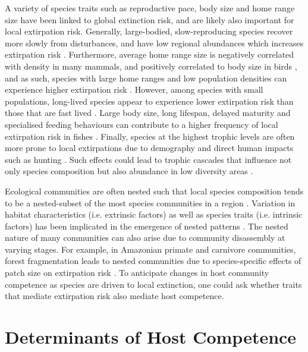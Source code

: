 A variety of species traits such as reproductive pace, body size and home range size have been linked to global extinction risk, and are likely also important for local extirpation risk.
Generally, large-bodied, slow-reproducing species recover more slowly from disturbances, and have low regional abundances which increases extirpation risk \citep{Damuth1981, Hanski1991, Nee1991, Cardillo2001, Meehan2004, Buckley2007, Davidson2009}.
Furthermore, average home range size is negatively correlated with density in many mammals, and positively correlated to body size in birds \citep{Bordes2009a, lee2011}, and as such, species with large home ranges and low population densities can experience higher extirpation risk \citep{Boyle2010}.
However, among species with small populations, long-lived species appear to experience lower extirpation risk than those that are fast lived \citep{Saether2011}.
Large body size, long lifespan, delayed maturity and specialised feeding behaviours can contribute to a higher frequency of local extirpation risk in fishes \citep{Olden2007}.
Finally, species at the highest trophic levels are often more prone to local extirpations due to demography and direct human impacts such as hunting \citep{Duffy2003}.
Such effects could lead to trophic cascades that influence not only species composition but also abundance in low diversity areas \citep{Hebblewhite2005}.

Ecological communities are often nested such that local species composition tends to be a nested-subset of the most species communities in a region \citep{Wright1998}.
Variation in habitat characteristics (i.e. extrinsic factors) as well as species traits (i.e. intrinsic factors) has been implicated in the emergence of nested patterns \citep{Almeida2007}.
The nested nature of many communities can also arise due to community disassembly at varying stages.
For example, in Amazonian primate and carnivore communities, forest fragmentation leads to nested communities due to species-specific effects of patch size on extirpation risk \citep{Michalski2005}.
To anticipate changes in host community competence as species are driven to local extinction, one could ask whether traits that mediate extirpation risk also mediate host competence.

\section{Determinants of Host Competence}

